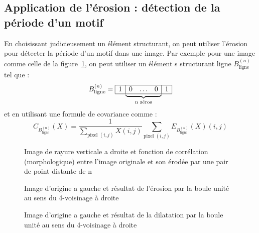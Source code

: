 \documentclass[10pt,a4paper]{article}
\begin{document}
{\subsection{Application de l'\'{e}rosion : d\'{e}tection de la p\'{e}riode d'un motif}
En choisissant  judicieusement un \'{e}l\'{e}ment structurant, on peut utiliser l'\'{e}rosion pour d\'{e}tecter la p\'{e}riode d'un motif dans une image. Par exemple pour une image comme celle de la figure~\ref{periode}, on peut utiliser un \'{e}l\'{e}ment s structurant ligne $B_{\text{ligne}}^{\left(n\right)}$ tel que : 
\begin{displaymath}
B_{\text{ligne}}^{\left(n\right)} = \begin{array}{|c|}
	\hline 1  \\
	\hline
\end{array}
\underset{\text{n z\'{e}ros}}{\underbrace{
\begin{array}{ccc}
	\hline  0 & \ldots & 0   \\
	\hline
\end{array}}}
\begin{array}{|c|}
	\hline 1  \\
	\hline
\end{array}
\end{displaymath}
et en utilisant une formule de covariance comme : 
\begin{displaymath}
	C_{B_{\text{ligne}}^{\left(n\right)}}\left(X\right)= \frac{1}{\underset{\text{pixel }\left(i,j\right)}{\sum} X\left(i,j\right) } \underset{\text{pixel }\left(i,j\right)}{\sum} E_{B_{\text{ligne}}^{\left(n\right)}}\left(X\right)\left(i,j\right) 
\end{displaymath}
\begin{figure}[h]
\scalebox{0.66}{}
\caption{Image de rayure verticale a droite et fonction de corr\'{e}lation (morphologique) entre l'image originale et son \'{e}rod\'{e}e par une pair de point distante de n}
\label{periode}
\end{figure}
\begin{figure}[h]
	\centering
\scalebox{0.45}{}\scalebox{0.45}{}
	\caption{Image d'origine a gauche et r\'{e}sultat de l’\'{e}rosion par la boule unit\'{e} au sens du 4-voisinage \`{a} droite}
	\label{erosion}
\end{figure}

\begin{figure}[h]
	\centering
	\scalebox{0.45}{}\scalebox{0.45}{}
	\caption{Image d'origine a gauche et r\'{e}sultat de la dilatation par la boule unit\'{e} au sens du 4-voisinage \`{a} droite}
	\label{dilatation}
\end{figure}
\clearpage


}
\end{document}
